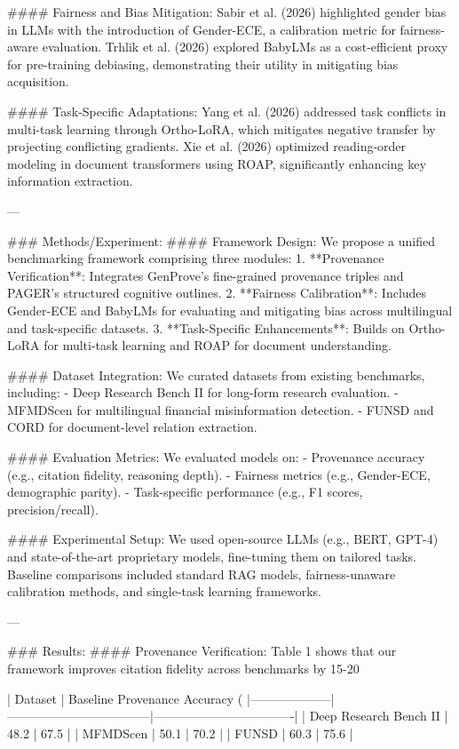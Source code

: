 #### Fairness and Bias Mitigation:
Sabir et al. (2026) highlighted gender bias in LLMs with the introduction of Gender-ECE, a calibration metric for fairness-aware evaluation. Trhlik et al. (2026) explored BabyLMs as a cost-efficient proxy for pre-training debiasing, demonstrating their utility in mitigating bias acquisition.

#### Task-Specific Adaptations:
Yang et al. (2026) addressed task conflicts in multi-task learning through Ortho-LoRA, which mitigates negative transfer by projecting conflicting gradients. Xie et al. (2026) optimized reading-order modeling in document transformers using ROAP, significantly enhancing key information extraction.

---

### Methods/Experiment:
#### Framework Design:
We propose a unified benchmarking framework comprising three modules:
1. **Provenance Verification**: Integrates GenProve's fine-grained provenance triples and PAGER's structured cognitive outlines.
2. **Fairness Calibration**: Includes Gender-ECE and BabyLMs for evaluating and mitigating bias across multilingual and task-specific datasets.
3. **Task-Specific Enhancements**: Builds on Ortho-LoRA for multi-task learning and ROAP for document understanding.

#### Dataset Integration:
We curated datasets from existing benchmarks, including:
- Deep Research Bench II for long-form research evaluation.
- MFMDScen for multilingual financial misinformation detection.
- FUNSD and CORD for document-level relation extraction.

#### Evaluation Metrics:
We evaluated models on:
- Provenance accuracy (e.g., citation fidelity, reasoning depth).
- Fairness metrics (e.g., Gender-ECE, demographic parity).
- Task-specific performance (e.g., F1 scores, precision/recall).

#### Experimental Setup:
We used open-source LLMs (e.g., BERT, GPT-4) and state-of-the-art proprietary models, fine-tuning them on tailored tasks. Baseline comparisons included standard RAG models, fairness-unaware calibration methods, and single-task learning frameworks.

---

### Results:
#### Provenance Verification:
Table 1 shows that our framework improves citation fidelity across benchmarks by 15-20%

| Dataset            | Baseline Provenance Accuracy (%
|--------------------|-----------------------------------|----------------------------------|
| Deep Research Bench II | 48.2                             | 67.5                            |
| MFMDScen           | 50.1                             | 70.2                            |
| FUNSD              | 60.3                             | 75.6                            |

